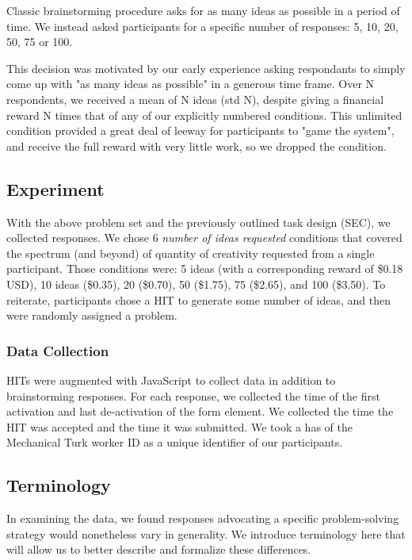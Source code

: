 Classic brainstorming procedure asks for as many ideas as possible in a period of time. We instead asked participants for a specific number of responses: 5, 10, 20, 50, 75 or 100.

This decision was motivated by our early experience asking respondants to simply come up with "as many ideas as possible" in a generous time frame. Over N respondents, we received a mean of N ideas (std N), despite giving a financial reward N times that of any of our explicitly numbered conditions. This unlimited condition provided a great deal of leeway for participants to "game the system", and receive the full reward with very little work, so we dropped the condition.

\subsection{Experiment}

With the above problem set and the previously outlined task design (SEC), we collected responses. We chose 6 \emph{number of ideas requested} conditions that covered the spectrum (and beyond) of quantity of creativity requested from a single participant. Those conditions were: 5 ideas (with a corresponding reward of \$0.18 USD), 10 ideas (\$0.35), 20 (\$0.70), 50 (\$1.75), 75 (\$2.65), and 100 (\$3.50). To reiterate, participants chose a HIT to generate some number of ideas, and then were randomly assigned a problem.

\subsubsection{Data Collection}

HITs were augmented with JavaScript to collect data in addition to brainstorming responses. For each response, we collected the time of the first activation and last de-activation of the form element. We collected the time the HIT was accepted and the time it was submitted. We took a has of the Mechanical Turk worker ID as a unique identifier of our participants.

\subsection{Terminology}

In examining the data, we found responses advocating a specific problem-solving strategy would nonetheless vary in generality. We introduce terminology here that will allow us to better describe and formalize these differences.


